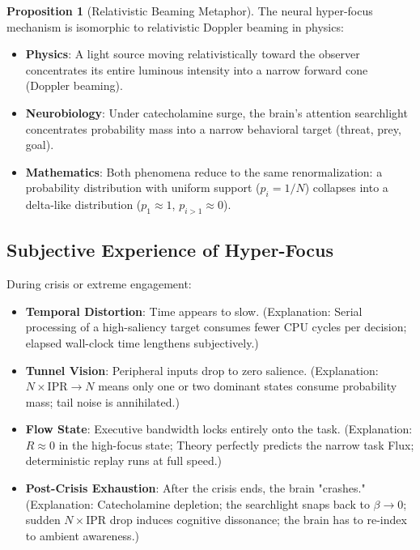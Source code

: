 \documentclass[11pt,oneside]{article}
\theoremstyle{definition}
\newtheorem{proposition}[theorem]{Proposition}
\begin{document}
\begin{proposition}[Relativistic Beaming Metaphor]
The neural hyper-focus mechanism is isomorphic to relativistic Doppler beaming in physics:

\begin{itemize}
  \item \textbf{Physics}: A light source moving relativistically toward the observer concentrates its entire luminous intensity into a narrow forward cone (Doppler beaming).

  \item \textbf{Neurobiology}: Under catecholamine surge, the brain's attention searchlight concentrates probability mass into a narrow behavioral target (threat, prey, goal).

  \item \textbf{Mathematics}: Both phenomena reduce to the same renormalization: a probability distribution with uniform support ($p_i = 1/N$) collapses into a delta-like distribution ($p_1 \approx 1$, $p_{i>1} \approx 0$).
\end{itemize}

\end{proposition}

\subsection{Subjective Experience of Hyper-Focus}

During crisis or extreme engagement:

\begin{itemize}
  \item \textbf{Temporal Distortion}: Time appears to slow. (Explanation: Serial processing of a high-saliency target consumes fewer CPU cycles per decision; elapsed wall-clock time lengthens subjectively.)

  \item \textbf{Tunnel Vision}: Peripheral inputs drop to zero salience. (Explanation: $N \times \text{IPR} \to N$ means only one or two dominant states consume probability mass; tail noise is annihilated.)

  \item \textbf{Flow State}: Executive bandwidth locks entirely onto the task. (Explanation: $R \approx 0$ in the high-focus state; Theory perfectly predicts the narrow task Flux; deterministic replay runs at full speed.)

  \item \textbf{Post-Crisis Exhaustion}: After the crisis ends, the brain "crashes." (Explanation: Catecholamine depletion; the searchlight snaps back to $\beta \to 0$; sudden $N \times \text{IPR}$ drop induces cognitive dissonance; the brain has to re-index to ambient awareness.)
\end{itemize}
\end{document}
